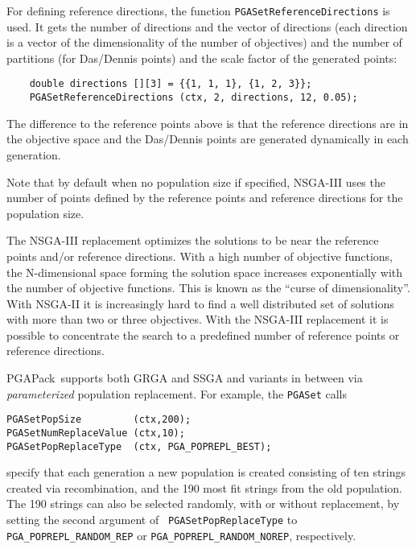 \documentclass{report}
\newcommand{\pga}{PGAPack}
\begin{document}
For defining reference directions, the function
\verb+PGASetReferenceDirections+ is used. It gets the number of
directions and the vector of directions (each direction is a vector of
the dimensionality of the number of objectives) and the number of
partitions (for Das/Dennis points) and the scale factor of the generated
points:

\begin{verbatim}
    double directions [][3] = {{1, 1, 1}, {1, 2, 3}};
    PGASetReferenceDirections (ctx, 2, directions, 12, 0.05);
\end{verbatim}

The difference to the reference points above is that the
reference directions are in the objective space and the Das/Dennis
points are generated dynamically in each generation.

Note that by default when no population size if specified, NSGA-III uses
the number of points defined by the reference points and reference
directions for the population size.

The NSGA-III replacement optimizes the solutions to be near the
reference points and/or reference directions. With a high number
of objective functions, the N-dimensional space forming the solution
space increases exponentially with the number of objective functions.
This is known as the ``curse of dimensionality''. With NSGA-II it is
increasingly hard to find a well distributed set of solutions with more
than two or three objectives.  With the NSGA-III
replacement it is possible to concentrate the search to a predefined
number of reference points or reference directions.

\pga\ supports both GRGA and SSGA and variants in between via {\em
parameterized} population replacement.  For example, the {\tt PGASet} calls
\begin{verbatim}
PGASetPopSize         (ctx,200);
PGASetNumReplaceValue (ctx,10);
PGASetPopReplaceType  (ctx, PGA_POPREPL_BEST);
\end{verbatim}
specify that each generation a new population is created consisting of ten
strings created via recombination, and the 190 most fit strings from the old
population.  The 190 strings can also be selected
randomly, with or without replacement, by setting the second argument of {\tt
PGASetPopReplaceType} to \verb+PGA_POPREPL_RANDOM_REP+ or
\verb+PGA_POPREPL_RANDOM_NOREP+, respectively.
\end{document}

